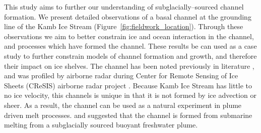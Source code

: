 This study aims to further our understanding of subglacially--sourced channel formation. We present detailed observations of a basal channel at the grounding line of the Kamb Ice Stream (Figure~\ref{fig:fieldwork_location}).  Through these observations we aim to better constrain ice and ocean interaction in the channel, and processes which have formed the channel. These results be can used as a case study to further constrain models of channel formation and growth, and therefore their impact on ice shelves. The channel has been noted previously in literature \citep{alley2016impacts,kim2016active,goeller2015subglacial,horgan2017poststagnation}, and was profiled by airborne radar during Center for Remote Sensing of Ice Sheets (CReSIS) airborne radar project \citep{arnold2020cresis}. Because Kamb Ice Stream has little to no ice velocity, this channels is unique in that it is not formed by ice advection or sheer. As a result, the channel can be used as a natural experiment in plume driven melt processes. \cite{kim2016active} and \cite{alley2016impacts} suggested that the channel is formed from submarine melting from a subglacially sourced buoyant freshwater plume.  

